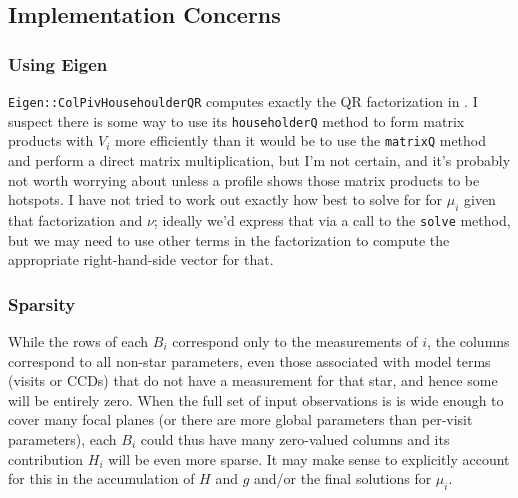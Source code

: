 \subsection{Implementation Concerns}

\subsubsection{Using Eigen}

\texttt{Eigen::ColPivHousehoulderQR} computes exactly the QR factorization in .
I suspect there is some way to use its \texttt{householderQ} method to form matrix products with $V_i$ more efficiently than it would be to use the \texttt{matrixQ} method and perform a direct matrix multiplication, but I'm not certain, and it's probably not worth worrying about unless a profile shows those matrix products to be hotspots.
I have not tried to work out exactly how best to solve for for $\mu_i$ given that factorization and $\nu$; ideally we'd express that via a call to the \texttt{solve} method, but we may need to use other terms in the factorization to compute the appropriate right-hand-side vector for that.

\subsubsection{Sparsity}

While the rows of each $B_i$ correspond only to the measurements of  $i$, the columns correspond to all non-star parameters, even those associated with model terms (visits or CCDs) that do not have a measurement for that star, and hence some will be entirely zero.
When the full set of input observations is is wide enough to cover many focal planes (or there are more global parameters than per-visit parameters), each $B_i$ could thus have many zero-valued columns and its contribution $H_i$ will be even more sparse.
It may make sense to explicitly account for this in the accumulation of $H$ and $g$ and/or the final solutions for $\mu_i$.


